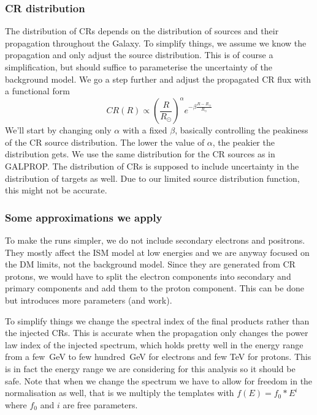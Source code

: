 \documentclass{article}
\begin{document}
\subsubsection*{CR distribution}
   
   The distribution of CRs depends on the distribution of sources and their
   propagation throughout the Galaxy.  To simplify things, we assume we know
   the propagation and only adjust the source distribution.  This is of course a
   simplification, but should suffice to parameterise the uncertainty of the
   background model.  We go a step further and adjust the propagated CR flux
   with a functional form
   \begin{equation}
      CR(R) \propto \left(\frac{R}{R_\odot}\right)^\alpha
      e^{-\beta\frac{R-R_\odot}{R_\odot}}
      \label{eq:CRsourceDistribution}
   \end{equation}
   We'll start by changing only $\alpha$ with a fixed $\beta$, basically controlling
   the peakiness of the CR source distribution.  The lower the value of
   $\alpha$, the peakier the distribution gets.  We use the same distribution
   for the CR sources as in GALPROP.  The distribution of CRs is
   supposed to include uncertainty in the distribution of targets as well.
   Due to our limited source distribution function, this might not be
   accurate.

\subsubsection*{Some approximations we apply}

   To make the runs simpler, we do not include secondary electrons and
   positrons.  They mostly affect the ISM model at low energies and we are
   anyway focused on the DM limits, not the background model.  Since they are
   generated from CR protons, we would have to split the electron components
   into secondary and primary components and add them to the proton component.
   This can be done but introduces more parameters (and work).

   To simplify things we change the spectral index of the final products
   rather than the injected CRs.  This is accurate when the propagation only
   changes the power law index of the injected spectrum, which holds pretty
   well in the energy range from a few\ GeV to few hundred\ GeV for electrons
   and few TeV for protons.  This is in fact the energy range we are
   considering for this analysis so it should be safe.  Note that when we
   change the spectrum we have to allow for freedom in the normalisation as
   well, that is we multiply the templates with $f(E) = f_0 * E^i$ where $f_0$
   and $i$ are free parameters.
\end{document}

